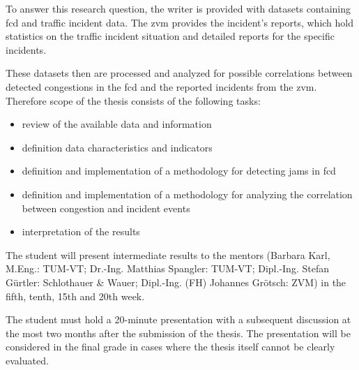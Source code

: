 \documentclass[a4paper,12pt]{report}
\begin{document}
To answer this research question, the writer is provided with datasets containing \acrshort{fcd} and traffic incident data. The \acrfull{zvm} provides the incident’s reports, which hold statistics on the traffic incident situation and detailed reports for the specific incidents.

These datasets then are processed and analyzed for possible correlations between detected congestions in the \acrshort{fcd} and the reported incidents from the \acrshort{zvm}. Therefore scope of the thesis consists of the following tasks:

\begin{itemize}
  \item review of the available data and information
  \item definition data characteristics and indicators
  \item definition and implementation of a methodology for detecting jams in \acrshort{fcd}
  \item definition and implementation of a methodology for analyzing the correlation between congestion and incident events
  \item interpretation of the results
\end{itemize}

The student will present intermediate results to the mentors 
		(Barbara Karl, M.Eng.: TUM-VT; 
		Dr.-Ing. Matthias Spangler: TUM-VT; 
		Dipl.-Ing. Stefan Gürtler: Schlothauer \& Wauer; 
		Dipl.-Ing. (FH) Johannes Grötsch: ZVM) 
	in the fifth, tenth, 15th and 20th week.

The student must hold a 20-minute presentation with a subsequent discussion at the most two months after the submission of the thesis. The presentation will be considered in the final grade in cases where the thesis itself cannot be clearly evaluated.

\renewcommand\abstractname{Preliminary information and disclaimers}
\abstract{
}

\renewcommand\abstractname{Kurzfassung}
\end{document}
